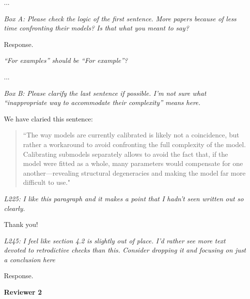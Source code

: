 \documentclass[11pt,letter]{article}
\begin{document}
...

\begin{mybox}
\emph{Box A: Please check the logic of the first sentence. More papers because of less time confronting their models? Is that what you meant to say?}
\end{mybox} 

Response.

\begin{mybox}
\emph{“For examples” should be “For example”?}
\end{mybox} 

...

\begin{mybox}
\emph{Box B: Please clarify the last sentence if possible. I’m not sure what “inappropriate way to accommodate their complexity” means here.}
\end{mybox}

We have claried this sentence:
\begin{quote}
``The way models are currently calibrated is likely not a coincidence, but rather a workaround to avoid confronting the full complexity of the model. Calibrating submodels separately allows to avoid the fact that, if the model were fitted as a whole, many parameters would compensate for one another---revealing structural degeneracies and making the model far more difficult to use."
\end{quote}

\begin{mybox}
\emph{L225: I like this paragraph and it makes a point that I hadn’t seen written out so clearly.}
\end{mybox}

Thank you!

\begin{mybox}
\emph{L245: I feel like section 4.2 is slightly out of place. I’d rather see more text devoted to retrodictive checks than this. Consider dropping it and focusing on just a conclusion here}
\end{mybox}

Response. %

{\bf Reviewer 2}
\end{document}
